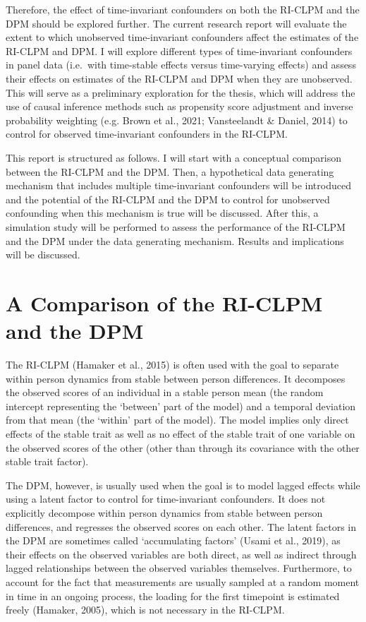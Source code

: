\documentclass[
]{interact}
\begin{document}
Therefore, the effect of time-invariant confounders on both the RI-CLPM
and the DPM should be explored further. The current research report will
evaluate the extent to which unobserved time-invariant confounders
affect the estimates of the RI-CLPM and DPM. I will explore different
types of time-invariant confounders in panel data (i.e.~with time-stable
effects versus time-varying effects) and assess their effects on
estimates of the RI-CLPM and DPM when they are unobserved. This will
serve as a preliminary exploration for the thesis, which will address
the use of causal inference methods such as propensity score adjustment
and inverse probability weighting (e.g. Brown et al., 2021; Vansteelandt
\& Daniel, 2014) to control for observed time-invariant confounders in
the RI-CLPM.

This report is structured as follows. I will start with a conceptual
comparison between the RI-CLPM and the DPM. Then, a hypothetical data
generating mechanism that includes multiple time-invariant confounders
will be introduced and the potential of the RI-CLPM and the DPM to
control for unobserved confounding when this mechanism is true will be
discussed. After this, a simulation study will be performed to assess
the performance of the RI-CLPM and the DPM under the data generating
mechanism. Results and implications will be discussed.

\hypertarget{a-comparison-of-the-ri-clpm-and-the-dpm}{%
\section{A Comparison of the RI-CLPM and the
DPM}\label{a-comparison-of-the-ri-clpm-and-the-dpm}}

The RI-CLPM (Hamaker et al., 2015) is often used with the goal to
separate within person dynamics from stable between person differences.
It decomposes the observed scores of an individual in a stable person
mean (the random intercept representing the `between' part of the model)
and a temporal deviation from that mean (the `within' part of the
model). The model implies only direct effects of the stable trait as
well as no effect of the stable trait of one variable on the observed
scores of the other (other than through its covariance with the other
stable trait factor).

The DPM, however, is usually used when the goal is to model lagged
effects while using a latent factor to control for time-invariant
confounders. It does not explicitly decompose within person dynamics
from stable between person differences, and regresses the observed
scores on each other. The latent factors in the DPM are sometimes called
`accumulating factors' (Usami et al., 2019), as their effects on the
observed variables are both direct, as well as indirect through lagged
relationships between the observed variables themselves. Furthermore, to
account for the fact that measurements are usually sampled at a random
moment in time in an ongoing process, the loading for the first
timepoint is estimated freely (Hamaker, 2005), which is not necessary in
the RI-CLPM.
\end{document}
